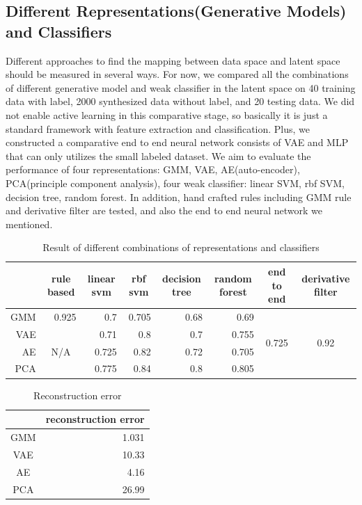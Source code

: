 \documentclass[10pt,twocolumn,letterpaper]{article}
\begin{document}
\subsection{Different Representations(Generative Models) and Classifiers}
Different approaches to find the mapping between data space and latent space should be measured in several ways. For now, we compared all the combinations of different generative model and weak classifier in the latent space on 40 training data with label, 2000 synthesized data without label, and 20 testing data. We did not enable active learning in this comparative stage, so basically it is just a standard framework with feature extraction and classification. Plus, we constructed a comparative end to end neural network consists of VAE and MLP that can only utilizes the small labeled dataset. We aim to evaluate the performance of four representations: GMM, VAE, AE(auto-encoder), PCA(principle component analysis), four weak classifier: linear SVM, rbf SVM, decision tree, random forest. In addition, hand crafted rules including GMM rule and derivative filter are tested, and also the end to end neural network we mentioned.

\begin{table}
    \centering
    \caption{Result of different combinations of representations and classifiers}
      \begin{tabular}{rcrrrrcc}
        \hline
             & rule based & \multicolumn{1}{c}{linear svm} & \multicolumn{1}{c}{rbf svm} & \multicolumn{1}{c}{decision tree} & \multicolumn{1}{c}{random forest} & \multicolumn{1}{p{6.5em}}{end to end} & derivative filter \\
            \hline
      GMM   & \multicolumn{1}{r}{0.925} & 0.7   & 0.705 & 0.68  & 0.69  & \multirow{4}[0]{*}{0.725} & \multirow{4}[0]{*}{0.92} \\
      VAE   & \multicolumn{1}{c}{\multirow{3}[0]{*}{N/A}} & 0.71  & 0.8   & 0.7   & 0.755 &       &  \\
      AE    &       & 0.725 & 0.82  & 0.72  & 0.705 &       &  \\
      PCA   &       & 0.775 & 0.84  & 0.8   & 0.805 &       &  \\
      \hline
      \end{tabular}%
    \label{tab:addlabel}%
  \end{table}

\begin{table}
    \centering
    \caption{Reconstruction error}
      \begin{tabular}{cr}
        \hline
            & \multicolumn{1}{p{12.535em}}{reconstruction error} \\
            \hline
      GMM   & 1.031 \\
      VAE   & 10.33 \\
      AE    & 4.16 \\
      PCA   & 26.99 \\
      \hline
      \end{tabular}%
    \label{tab:addlabel}%
  \end{table}%
  
\end{document}
